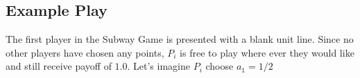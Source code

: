 \documentclass{acm_proc_article-sp}
\begin{document}
\subsection{Example Play}
The first player in the Subway Game is presented with a blank unit line. Since no other players have chosen any points, $P_i$ is free to play where ever they would like and still receive payoff of $1.0$. Let's imagine $P_i$ choose $a_1=1/2$





\end{document}
